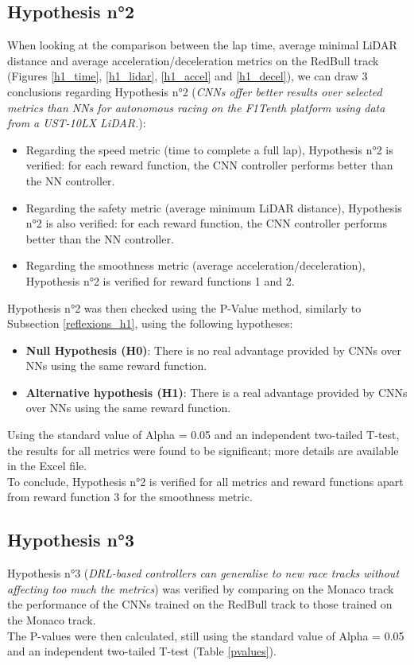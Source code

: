 \subsection{Hypothesis n°2}
When looking at the comparison between the lap time, average minimal LiDAR distance and average acceleration/deceleration metrics on the RedBull track (Figures \ref{h1_time}, \ref{h1_lidar}, \ref{h1_accel} and \ref{h1_decel}), we can draw 3 conclusions regarding Hypothesis n°2 (\textit{CNNs offer better results over selected metrics than NNs for autonomous racing on the F1Tenth platform using data from a UST-10LX LiDAR.}):
\begin{itemize}
	\item Regarding the speed metric (time to complete a full lap), Hypothesis n°2 is verified: for each reward function, the CNN controller performs better than the NN controller.
	\item Regarding the safety metric (average minimum LiDAR distance), Hypothesis n°2 is also verified: for each reward function, the CNN controller performs better than the NN controller.
	\item Regarding the smoothness metric (average acceleration/deceleration), Hypothesis n°2 is verified for reward functions 1 and 2.
\end{itemize}

Hypothesis n°2 was then checked using the P-Value method, similarly to Subsection \ref{reflexions_h1}, using the following hypotheses:

\begin{itemize}
	\item \textbf{Null Hypothesis (H0)}: There is no real advantage provided by CNNs over NNs using the same reward function.
	\item \textbf{Alternative hypothesis (H1)}: There is a real advantage provided by CNNs over NNs using the same reward function.
\end{itemize}

Using the standard value of Alpha = 0.05 and an independent two-tailed T-test, the results for all metrics were found to be significant; more details are available in the Excel file. \\
To conclude, Hypothesis n°2 is verified for all metrics and reward functions apart from reward function 3 for the smoothness metric.

\subsection{Hypothesis n°3}
Hypothesis n°3 (\textit{DRL-based controllers can generalise to new race tracks without affecting too much the metrics}) was verified by comparing on the Monaco track the performance of the CNNs trained on the RedBull track to those trained on the Monaco track. \\
The P-values were then calculated, still using the standard value of Alpha = 0.05 and an independent two-tailed T-test (Table \ref{pvalues}).

